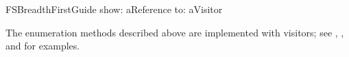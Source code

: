 \documentclass[a4paper,10pt,twoside]{book}
\begin{document}
\begin{code}{}
    FSBreadthFirstGuide show: aReference to: aVisitor
\end{code}	

The enumeration methods described above are implemented with visitors; see , , and  for examples.



\ifx\wholebook\relax\else
   
   
\end{document}
